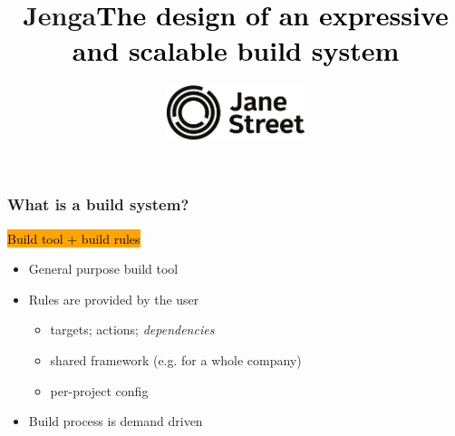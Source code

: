\documentclass{beamer}
\begin{document}
\title{\Huge{\bf Jenga}\vskip24pt\large\textcolor{black}{The design of an expressive and scalable build system}}

\date{
\includegraphics[width=4cm]{new-jane-street-logo.pdf}
}



\let\oldframetitle\frametitle
\renewcommand{\frametitle}[1]{%
  \oldframetitle{\vskip4pt\hskip4pt#1}\setstretch{1.4}}

\newcommand\gdb{{\tt gdb}}
\newcommand\gap{\vskip18pt}
\newcommand\highlight[1]{\colorbox{orange}{\textcolor{black}{#1}}}


\begin{frame}
\titlepage
\end{frame}




\begin{frame}[fragile]
\frametitle{What is a build system?}
\begin{center}
\highlight{Build tool + build rules}
\end{center}
\begin{itemize}
\item General purpose build tool
\item Rules are provided by the user
\begin{itemize}
\item targets; actions; {\em dependencies}
\item shared framework (e.g. for a whole company)
\item per-project config
\end{itemize}
\item Build process is demand driven
\end{itemize}
\end{frame}
\end{document}

